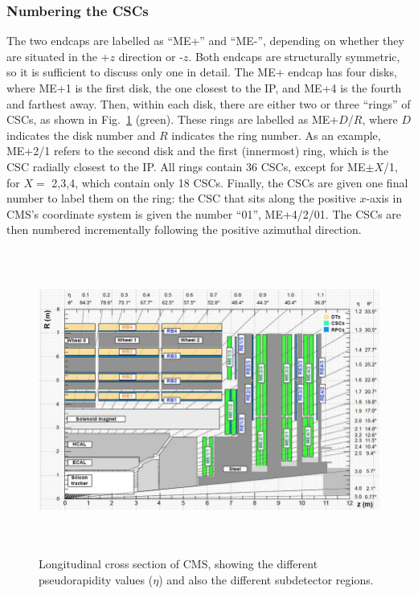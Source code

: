 \subsubsection{Numbering the CSCs}
\label{subsubsec:csc_numbering}
The two endcaps are labelled as ``ME+'' and ``ME-'', depending on whether they are situated in the +$z$ direction or -$z$.
Both endcaps are structurally symmetric, so it is sufficient to discuss only one in detail.
The ME+ endcap has four disks, where ME+1 is the first disk, the one closest to the IP, and ME+4 is the fourth and farthest away. 
Then, within each disk, there are either two or three ``rings'' of CSCs, as shown in Fig.~\ref{fig:cms_long_view_subdetectors} (green).
These rings are labelled as ME+$D$/$R$, where $D$ indicates the disk number and $R$ indicates the ring number.
As an example, ME+2/1 refers to the second disk and the first (innermost) ring, which is the CSC radially closest to the IP.
All rings contain 36 CSCs, except for ME$\pm X$/1, for $X=$ 2,3,4, which contain only 18 CSCs.
Finally, the CSCs are given one final number to label them on the ring:
the CSC that sits along the positive $x$-axis in CMS's coordinate system is given the number ``01'', \eg ME+4/2/01. 
The CSCs are then numbered incrementally following the positive azimuthal direction.
\begin{figure}[pbth]
\centering
\includegraphics[width=15cm,height=10cm,keepaspectratio]{figures/cms/cms_longitudinal_view.png}
    \caption{
    Longitudinal cross section of CMS, showing the different pseudorapidity values ($\eta$) and also the different subdetector regions.
    }
    \label{fig:cms_long_view_subdetectors}
\end{figure}

